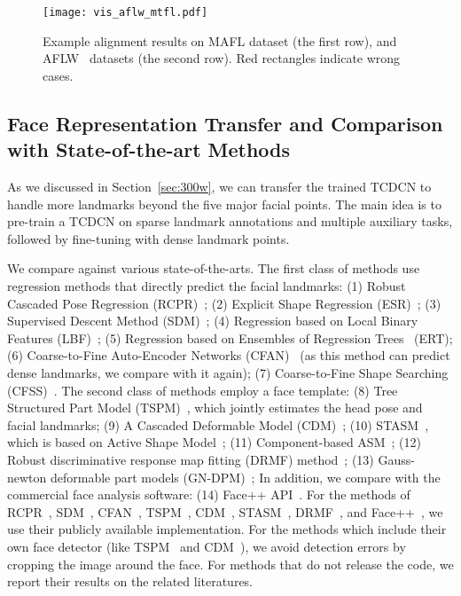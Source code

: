 \documentclass[10pt,journal,compsoc]{IEEEtran}
\begin{document}
\begin{figure*}[t]
  \centering
  \texttt{[image: vis\_aflw\_mtfl.pdf]}
  \vskip -0.3cm
  \caption{Example alignment results on MAFL dataset (the first row), and AFLW~\cite{Kostinger2011} datasets (the second row). Red rectangles indicate wrong cases.}
  \label{fig:visual_examples_MTFL_AFLW}
  \vskip -0.3cm
\end{figure*}

\vskip -0.3cm
\subsection{Face Representation Transfer and Comparison with State-of-the-art Methods}
\label{subset:cmp_state_of_the_art}
As we discussed in Section~\ref{sec:300w}, we can transfer the trained TCDCN to handle more landmarks beyond the five major facial points.
The main idea is to pre-train a TCDCN on sparse landmark annotations and multiple auxiliary tasks, followed by fine-tuning with dense landmark points.

We compare against various state-of-the-arts. The first class of methods use regression methods that directly predict the facial landmarks: (1) Robust Cascaded Pose Regression (RCPR)~\cite{dollar13}; (2) Explicit Shape Regression (ESR)~\cite{Cao2012}; (3) Supervised Descent Method (SDM)~\cite{6618919}; (4) Regression based on Local Binary Features (LBF)~\cite{300w_lbp}; (5) Regression based on Ensembles of Regression Trees~\cite{kazemi2014one} (ERT); (6) Coarse-to-Fine Auto-Encoder Networks (CFAN)~\cite{zhang2014coarse} (as this method can predict dense landmarks, we compare with it again); (7) Coarse-to-Fine Shape Searching (CFSS)~\cite{zhu2015face}. The second class of methods employ a face template: (8) Tree Structured Part Model (TSPM)~\cite{Zhu2012}, which jointly estimates the head pose and facial landmarks; (9) A Cascaded Deformable Model (CDM)~\cite{Yu2013}; (10) STASM~\cite{milborrow2008locating}, which is based on Active Shape Model~\cite{cootes1995active}; (11) Component-based ASM~\cite{Helen}; (12) Robust discriminative response map fitting (DRMF) method~\cite{asthana2013robust}; (13) Gauss-newton deformable part models (GN-DPM)~\cite{tzimiropoulos2014gauss}; In addition, we compare with the  commercial face analysis software: (14) Face++ API~\cite{FACEPP}. For the methods of RCPR~\cite{dollar13}, SDM~\cite{6618919}, CFAN~\cite{zhang2014coarse}, TSPM~\cite{Zhu2012}, CDM~\cite{Yu2013}, STASM~\cite{milborrow2008locating}, DRMF~\cite{asthana2013robust}, and Face++~\cite{FACEPP}, we use their publicly available implementation. For the methods which include their own face detector (like TSPM~\cite{Zhu2012} and CDM~\cite{Yu2013}), we avoid detection errors by cropping the image around the face. For methods that do not release the code, we report their results on the related literatures.
\end{document}

